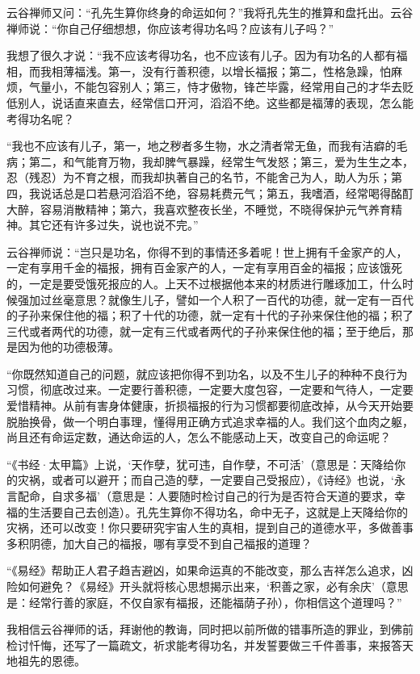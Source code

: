 \documentclass[12pt,UTF8]{ctexbook}
\begin{document}
云谷禅师又问：“孔先生算你终身的命运如何？”我将孔先生的推算和盘托出。云谷禅师说：“你自己仔细想想，你应该考得功名吗？应该有儿子吗？”

我想了很久才说：“我不应该考得功名，也不应该有儿子。因为有功名的人都有福相，而我相薄福浅。第一，没有行善积德，以增长福报；第二，性格急躁，怕麻烦，气量小，不能包容别人；第三，恃才傲物，锋芒毕露，经常用自己的才华去贬低别人，说话直来直去，经常信口开河，滔滔不绝。这些都是福薄的表现，怎么能考得功名呢？

“我也不应该有儿子，第一，地之秽者多生物，水之清者常无鱼，而我有洁癖的毛病；第二，和气能育万物，我却脾气暴躁，经常生气发怒；第三，爱为生生之本，忍（残忍）为不育之根，而我却执著自己的名节，不能舍己为人，助人为乐；第四，我说话总是口若悬河滔滔不绝，容易耗费元气；第五，我嗜酒，经常喝得酩酊大醉，容易消散精神；第六，我喜欢整夜长坐，不睡觉，不晓得保护元气养育精神。其它还有许多过失，说也说不完。”

云谷禅师说：“岂只是功名，你得不到的事情还多着呢！世上拥有千金家产的人，一定有享用千金的福报，拥有百金家产的人，一定有享用百金的福报；应该饿死的，一定是要受饿死报应的人。上天不过根据他本来的材质进行雕琢加工，什么时候强加过丝毫意思？就像生儿子，譬如一个人积了一百代的功德，就一定有一百代的子孙来保住他的福；积了十代的功德，就一定有十代的子孙来保住他的福；积了三代或者两代的功德，就一定有三代或者两代的子孙来保住他的福；至于绝后，那是因为他的功德极薄。

“你既然知道自己的问题，就应该把你得不到功名，以及不生儿子的种种不良行为习惯，彻底改过来。一定要行善积德，一定要大度包容，一定要和气待人，一定要爱惜精神。从前有害身体健康，折损福报的行为习惯都要彻底改掉，从今天开始要脱胎换骨，做一个明白事理，懂得用正确方式追求幸福的人。我们这个血肉之躯，尚且还有命运定数，通达命运的人，怎么不能感动上天，改变自己的命运呢？

“《书经·太甲篇》上说，‘天作孽，犹可违，自作孽，不可活’（意思是：天降给你的灾祸，或者可以避开；而自己造的孽，一定要自己受报应），《诗经》也说，‘永言配命，自求多福’（意思是：人要随时检讨自己的行为是否符合天道的要求，幸福的生活要自己去创造）。孔先生算你不得功名，命中无子，这就是上天降给你的灾祸，还可以改变！你只要研究宇宙人生的真相，提到自己的道德水平，多做善事多积阴德，加大自己的福报，哪有享受不到自己福报的道理？

“《易经》帮助正人君子趋吉避凶，如果命运真的不能改变，那么吉祥怎么追求，凶险如何避免？《易经》开头就将核心思想揭示出来，‘积善之家，必有余庆’（意思是：经常行善的家庭，不仅自家有福报，还能福荫子孙），你相信这个道理吗？”

我相信云谷禅师的话，拜谢他的教诲，同时把以前所做的错事所造的罪业，到佛前检讨忏悔，还写了一篇疏文，祈求能考得功名，并发誓要做三千件善事，来报答天地祖先的恩德。
\end{document}
